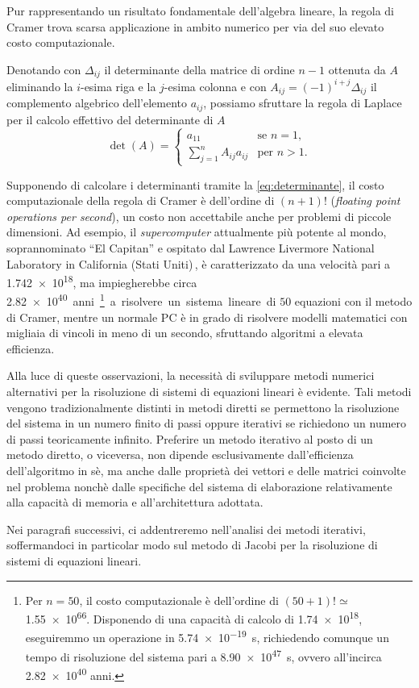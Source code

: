 Pur rappresentando un risultato fondamentale dell'algebra lineare, la regola di Cramer trova scarsa applicazione in ambito numerico per via del suo elevato 
costo computazionale.

Denotando con $\Delta_{ij}$ il determinante della matrice di ordine $n-1$ ottenuta da $A$ eliminando la $i$-esima riga e la $j$-esima colonna e con 
$A_{ij} = (-1)^{i+j}\Delta_{ij}$ il complemento algebrico dell'elemento $a_{ij}$, possiamo sfruttare la regola di Laplace per il calcolo effettivo del 
determinante di $A$
\begin{equation}
\label{eq:determinante}
    \det(A) = 
    \begin{cases}
        a_{11} & \text{se } n=1, \\[1em]
        \displaystyle\sum_{j=1}^{n} A_{ij}a_{ij} & \text{per } n>1.
    \end{cases}
\end{equation}

Supponendo di calcolare i determinanti tramite la \eqref{eq:determinante}, il costo computazionale della regola di Cramer \`e 
dell'ordine di $(n+1)!$ \si{\flops} (\textit{floating point operations per second}), un costo non accettabile anche per problemi di 
piccole dimensioni.\newline
Ad esempio, il \textit{supercomputer} attualmente pi\`u potente al mondo, soprannominato \enquote{El Capitan} e ospitato dal 
Lawrence Livermore National Laboratory in California (Stati Uniti)\,\cite{Thomas2024}, \`e caratterizzato da una velocit\`a pari a 
\SI{1.742e18}{\flops}, ma impiegherebbe circa \SI{2.82e40} anni\footnote{Per $n=50$, il costo computazionale \`e dell'ordine di 
$(50+1)!\simeq$\SI{1.55e66}{\flops}.\newline
Disponendo di una capacit\`a di calcolo di \SI{1.74e18}{\flops}, eseguiremmo un operazione in \SI{5.74e-19}{s}, richiedendo 
comunque un tempo di risoluzione del sistema pari a \SI{8.90e47}{s}, ovvero all'incirca \num{2.82e40} anni.}a risolvere un sistema 
lineare di $50$ equazioni con il metodo di Cramer, mentre un normale PC \`e in grado di risolvere modelli matematici con migliaia 
di vincoli in meno di un secondo, sfruttando algoritmi a elevata efficienza.

Alla luce di queste osservazioni, la necessit\`a di sviluppare metodi numerici alternativi per la risoluzione di sistemi di 
equazioni lineari \`e evidente. 
Tali metodi vengono tradizionalmente distinti in metodi
diretti se permettono la risoluzione del sistema in un numero finito di passi oppure iterativi se richiedono un numero di passi
teoricamente infinito.\newline
Preferire un metodo iterativo al posto di un metodo diretto, o viceversa, non dipende esclusivamente dall'efficienza dell'algoritmo in s\`e, ma anche dalle propriet\`a dei vettori e delle matrici coinvolte nel problema nonch\`e dalle specifiche del sistema di elaborazione relativamente alla capacit\`a di memoria e all'architettura adottata.

Nei paragrafi successivi, ci addentreremo nell'analisi dei metodi iterativi, soffermandoci in particolar modo sul metodo di Jacobi per la risoluzione di sistemi di equazioni lineari.

